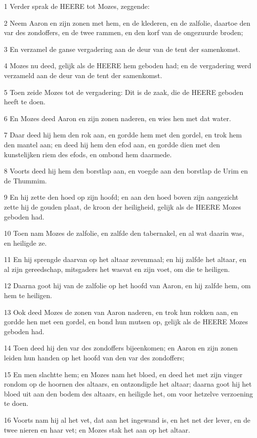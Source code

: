 \par 1 Verder sprak de HEERE tot Mozes, zeggende:
\par 2 Neem Aaron en zijn zonen met hem, en de klederen, en de zalfolie, daartoe den var des zondoffers, en de twee rammen, en den korf van de ongezuurde broden;
\par 3 En verzamel de ganse vergadering aan de deur van de tent der samenkomst.
\par 4 Mozes nu deed, gelijk als de HEERE hem geboden had; en de vergadering werd verzameld aan de deur van de tent der samenkomst.
\par 5 Toen zeide Mozes tot de vergadering: Dit is de zaak, die de HEERE geboden heeft te doen.
\par 6 En Mozes deed Aaron en zijn zonen naderen, en wies hen met dat water.
\par 7 Daar deed hij hem den rok aan, en gordde hem met den gordel, en trok hem den mantel aan; en deed hij hem den efod aan, en gordde dien met den kunstelijken riem des efods, en ombond hem daarmede.
\par 8 Voorts deed hij hem den borstlap aan, en voegde aan den borstlap de Urim en de Thummim.
\par 9 En hij zette den hoed op zijn hoofd; en aan den hoed boven zijn aangezicht zette hij de gouden plaat, de kroon der heiligheid, gelijk als de HEERE Mozes geboden had.
\par 10 Toen nam Mozes de zalfolie, en zalfde den tabernakel, en al wat daarin was, en heiligde ze.
\par 11 En hij sprengde daarvan op het altaar zevenmaal; en hij zalfde het altaar, en al zijn gereedschap, mitsgaders het wasvat en zijn voet, om die te heiligen.
\par 12 Daarna goot hij van de zalfolie op het hoofd van Aaron, en hij zalfde hem, om hem te heiligen.
\par 13 Ook deed Mozes de zonen van Aaron naderen, en trok hun rokken aan, en gordde hen met een gordel, en bond hun mutsen op, gelijk als de HEERE Mozes geboden had.
\par 14 Toen deed hij den var des zondoffers bijeenkomen; en Aaron en zijn zonen leiden hun handen op het hoofd van den var des zondoffers;
\par 15 En men slachtte hem; en Mozes nam het bloed, en deed het met zijn vinger rondom op de hoornen des altaars, en ontzondigde het altaar; daarna goot hij het bloed uit aan den bodem des altaars, en heiligde het, om voor hetzelve verzoening te doen.
\par 16 Voorts nam hij al het vet, dat aan het ingewand is, en het net der lever, en de twee nieren en haar vet; en Mozes stak het aan op het altaar.

